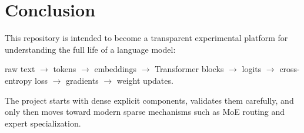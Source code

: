 \documentclass[11pt]{article}
\begin{document}
\section{Conclusion}

This repository is intended to become a transparent experimental platform for
understanding the full life of a language model:

\begin{center}
raw text $\rightarrow$ tokens $\rightarrow$ embeddings $\rightarrow$ Transformer blocks
$\rightarrow$ logits $\rightarrow$ cross-entropy loss $\rightarrow$ gradients
$\rightarrow$ weight updates.
\end{center}

The project starts with dense explicit components, validates them carefully, and only
then moves toward modern sparse mechanisms such as MoE routing and expert specialization.
\end{document}

